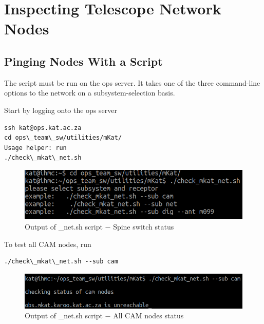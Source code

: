 \section{ Inspecting Telescope Network Nodes}
\subsection{ Pinging Nodes With a Script}
The script must be run on the ops server. It takes one of the three command-line options to the network on a subsystem-selection basis.

Start by logging onto the ops server
\begin{lstlisting}[style=DOS]
ssh kat@ops.kat.ac.za
cd ops\_team\_sw/utilities/mKat/
Usage helper: run 
./check\_mkat\_net.sh

\end{lstlisting}


\begin{figure}[!thb]
	\centering
	\includegraphics[scale=0.23]{Chapters/images/image127.png}
	
	\caption{Output of \_net.sh script $-$ Spine switch status}
	\label{fig:image127}
\end{figure}


To test all CAM nodes, run
\begin{lstlisting}[style=DOS]
./check\_mkat\_net.sh --sub cam

\end{lstlisting}




\begin{figure}[!thb]
	\centering
	\includegraphics[scale=0.23]{Chapters/images/image55.png}
	
	\caption{Output of \_net.sh script $-$ All CAM nodes status}
	\label{fig:image55}
\end{figure}


